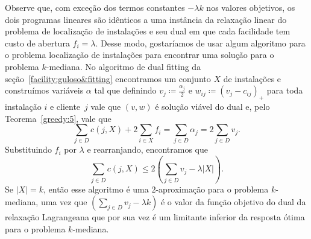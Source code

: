 Observe que, com exceção dos termos constantes $-\lambda k$ nos valores objetivos, os dois programas lineares são idênticos a uma instância da relaxação linear do problema de localização de instalações e seu dual em que cada facilidade tem custo de abertura $f_i = \lambda$. Desse modo, gostaríamos de usar algum algoritmo para o problema localização de instalações para encontrar uma solução para o problema $k$-mediana. No algoritmo de dual fitting da seção~\ref{facility:guloso&fitting} encontramos um conjunto $X$ de instalações e construímos variáveis $\alpha$ tal que definindo $v_j \coloneqq \frac{\alpha_j}{2}$ e $w_{ij} \coloneqq (v_j - c_{ij})_+$ para toda instalação $i$ e cliente~$j$ vale que $(v, w)$ é solução viável do dual e, pelo Teorema~\ref{greedy:5}, vale que
\[\sum_{j \in D} c(j,X) + 2\sum_{i \in X} f_i = \sum_{j \in D} \alpha_j =  2\sum_{j\in D} v_j.\]
Substituindo $f_i$ por $\lambda$ e rearranjando, encontramos que
\[\sum_{j\in D} c(j,X) \leq 2\left(\sum_{j\in D}v_j - \lambda|X|\right).\]
Se $|X| = k$, então esse algoritmo é uma $2$-aproximação para o problema $k$-mediana, uma vez que $\left( \sum_{j\in D} v_j - \lambda k\right)$ é o valor da função objetivo do dual da relaxação Lagrangeana que por sua vez é um limitante inferior da resposta ótima para o problema $k$-mediana. 

